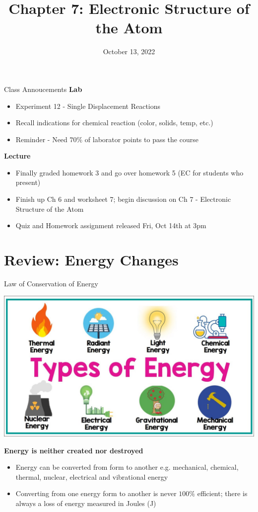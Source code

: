 \documentclass[11pt]{beamer}
\title{Chapter 7: Electronic Structure of the Atom}
\institute{Chemistry Department, Cypress College}
\date{October 13, 2022}
\begin{document}
\begin{frame}
  \titlepage
\end{frame}

\begin{frame}{Class Annoucements}
  \textbf{Lab}
  \begin{itemize}
  \item Experiment 12 - Single Displacement Reactions
  \item Recall indications for chemical reaction (color, solids,
    temp, etc.)
  \item Reminder - Need $70\%$ of laborator points to pass the course
  \end{itemize}
  
  \textbf{Lecture}
  \begin{itemize}
  \item Finally graded homework 3 and go over homework 5 (EC for
    students who present)
  \item Finish up Ch 6 and worksheet 7; begin discussion on Ch 7
    - Electronic Structure of the Atom
  \item Quiz and Homework assignment released Fri, Oct 14th at 3pm
  \end{itemize}
\end{frame}

\section{Review: Energy Changes}

\begin{frame}{Law of Conservation of Energy}
  \begin{center}
    \includegraphics[scale=0.13]{energy_types}
    
    \textbf{Energy is neither created nor destroyed}
  \end{center}

  \begin{itemize}
  \item Energy can be converted from form to another
    e.g. mechanical, chemical, thermal, nuclear,
    electrical and vibrational energy
  \item Converting from one energy form to another is
    never $100\%$ efficient; there is always a loss of
    energy measured in Joules (J)
  \end{itemize}
\end{frame}
\end{document}
